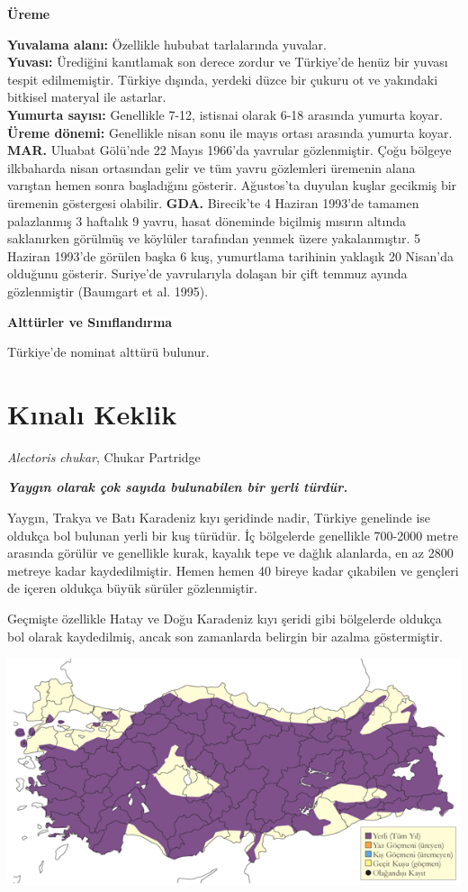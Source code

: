 \documentclass[
  letterpaper,
  DIV=11,
  numbers=noendperiod]{scrreprt}
\begin{document}
\textbf{Üreme}

\textbf{Yuvalama alanı:} Özellikle hububat tarlalarında yuvalar.\\
\textbf{Yuvası:} Ürediğini kanıtlamak son derece zordur ve Türkiye'de
henüz bir yuvası tespit edilmemiştir. Türkiye dışında, yerdeki düzce bir
çukuru ot ve yakındaki bitkisel materyal ile astarlar.\\
\textbf{Yumurta sayısı:} Genellikle 7-12, istisnai olarak 6-18 arasında
yumurta koyar.\\
\textbf{Üreme dönemi:} Genellikle nisan sonu ile mayıs ortası arasında
yumurta koyar. \textbf{MAR.} Uluabat Gölü'nde 22 Mayıs 1966'da yavrular
gözlenmiştir. Çoğu bölgeye ilkbaharda nisan ortasından gelir ve tüm
yavru gözlemleri üremenin alana varıştan hemen sonra başladığını
gösterir. Ağustos'ta duyulan kuşlar gecikmiş bir üremenin göstergesi
olabilir. \textbf{GDA.} Birecik'te 4 Haziran 1993'de tamamen palazlanmış
3 haftalık 9 yavru, hasat döneminde biçilmiş mısırın altında saklanırken
görülmüş ve köylüler tarafından yenmek üzere yakalanmıştır. 5 Haziran
1993'de görülen başka 6 kuş, yumurtlama tarihinin yaklaşık 20 Nisan'da
olduğunu gösterir. Suriye'de yavrularıyla dolaşan bir çift temmuz ayında
gözlenmiştir (Baumgart et al. 1995).

\textbf{Alttürler ve Sınıflandırma}

Türkiye'de nominat alttürü bulunur.

\section{Kınalı Keklik}\label{kux131nalux131-keklik}

\emph{Alectoris chukar}, Chukar Partridge

\textbf{\emph{Yaygın olarak çok sayıda bulunabilen bir yerli türdür.}}

Yaygın, Trakya ve Batı Karadeniz kıyı şeridinde nadir, Türkiye genelinde
ise oldukça bol bulunan yerli bir kuş türüdür. İç bölgelerde genellikle
700-2000 metre arasında görülür ve genellikle kurak, kayalık tepe ve
dağlık alanlarda, en az 2800 metreye kadar kaydedilmiştir. Hemen hemen
40 bireye kadar çıkabilen ve gençleri de içeren oldukça büyük sürüler
gözlenmiştir.

Geçmişte özellikle Hatay ve Doğu Karadeniz kıyı şeridi gibi bölgelerde
oldukça bol olarak kaydedilmiş, ancak son zamanlarda belirgin bir azalma
göstermiştir.

\includegraphics{images/harita_Page_039.png}
\end{document}
